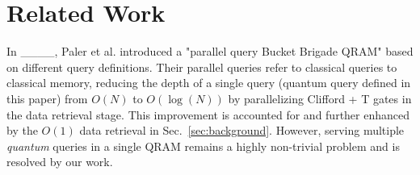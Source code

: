 \section{Related Work}
In ____, Paler et al. introduced a "parallel query Bucket Brigade QRAM" based on different query definitions. Their parallel queries refer to classical queries to classical memory, reducing the depth of a single query (quantum query defined in this paper) from $O(N)$ to $O(\log(N))$ by parallelizing Clifford + T gates in the data retrieval stage. This improvement is accounted for and further enhanced by the $O(1)$ data retrieval in Sec.~\ref{sec:background}. However, serving multiple \emph{quantum} queries in a single QRAM remains a highly non-trivial problem and is resolved by our work.
